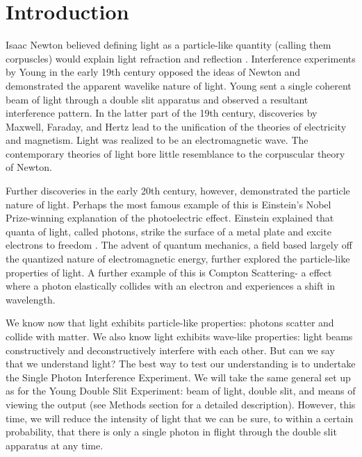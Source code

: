 \documentclass[prb,preprint]{revtex4-1}
\begin{document}
\section{Introduction} %

Isaac Newton believed defining light as a particle-like quantity (calling them corpuscles) would explain light refraction and reflection \cite{newton}.  Interference experiments by Young in the early 19th century opposed the ideas of Newton and demonstrated the apparent wavelike nature of light. Young sent a single coherent beam of light through a double slit apparatus and observed a resultant interference pattern. In the latter part of the 19th century, discoveries by Maxwell, Faraday, and Hertz lead to the unification of the theories of electricity and magnetism.  Light was realized to be an electromagnetic wave.  The contemporary theories of light bore little resemblance to the corpuscular theory of Newton.  \cite{david}

Further discoveries in the early 20th century, however, demonstrated the particle nature of light.  Perhaps the most famous example of this is Einstein's Nobel Prize-winning explanation of the photoelectric effect.  Einstein explained that quanta of light, called photons, strike the surface of a metal plate and excite electrons to freedom \cite{modern}.  The advent of quantum mechanics, a field based largely off the quantized nature of electromagnetic energy, further explored the particle-like properties of light.  A further example of this is Compton Scattering- a effect where a photon elastically collides with an electron and experiences a shift in wavelength.  

We know now that light exhibits particle-like properties: photons scatter and collide with matter.  We also know light exhibits wave-like properties: light beams constructively and deconstructively interfere with each other.  But can we say that we understand light?  The best way to test our understanding is to undertake the Single Photon Interference Experiment.  We will take the same general set up as for the Young Double Slit Experiment:  beam of light, double slit, and means of viewing the output (see Methods section for a detailed description).  However, this time, we will reduce the intensity of light that we can be sure, to within a certain probability, that there is only a single photon in flight through the double slit apparatus at any time. \cite{teachspin}
\end{document}
